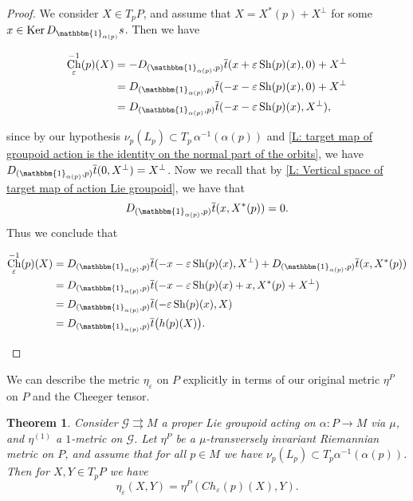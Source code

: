 \documentclass[12pt,a4paper,reqno]{amsart}
\DeclareMathOperator{\Ch}{Ch}
\DeclareMathOperator{\kernel}{Ker}
\DeclareMathOperator{\Sh}{Sh} %
\newcommand{\1}{\mathbbm{1}} %
\newcommand{\G}{\mathcal{G}} %
\newtheorem{thm}{Theorem}[section]
\theoremstyle{definition}
\theoremstyle{TheoremNum}
\begin{document}
\begin{proof}
We consider $X\in T_p P$, and assume that $X = X^\ast(p)+X^\perp$ for some $x\in \kernel D_{\1_{\alpha(p)}} s$. Then we have 
\begin{linenomath}
\begin{align*}
\Ch^{-1}_{\varepsilon}(p) (X) &= -D_{(\1_{\alpha(p)},p)} \overline{t}(x+\varepsilon \Sh(p)(x),0)+X^\perp\\
&=D_{(\1_{\alpha(p)},p)} \overline{t}(-x-\varepsilon \Sh(p)(x),0)+X^\perp\\
& = D_{(\1_{\alpha(p)},p)} \overline{t}(-x-\varepsilon \Sh(p)(x),X^\perp),
\end{align*}
\end{linenomath}
since by our hypothesis $\nu_p(L_p)\subset T_p\, \alpha^{-1}(\alpha(p))$ and \th\ref{L: target map of groupoid action is the identity on the normal part of the orbits}, we have \linebreak$D_{(\1_{\alpha(p)},p)}\overline{t}(0,X^\perp) = X^\perp$. Now we recall that by \th\ref{L: Vertical space of target map of action Lie groupoid}, we have that 
\[
D_{(\1_{\alpha(p)},p)} \overline{t}(x,X^\ast(p)) =0.
\]
Thus we conclude that 
\begin{linenomath}
\begin{align*}
\Ch^{-1}_{\varepsilon}(p) (X) &=D_{(\1_{\alpha(p)},p)} \overline{t}(-x-\varepsilon \Sh(p)(x),X^\perp) + D_{(\1_{\alpha(p)},p)} \overline{t}(x,X^\ast(p))\\
&= D_{(\1_{\alpha(p)},p)} \overline{t}(-x-\varepsilon \Sh(p)(x)+x,X^\ast(p)+X^\perp)\\
&= D_{(\1_{\alpha(p)},p)} \overline{t}(-\varepsilon\Sh(p)(x), X)\\
& =D_{(\1_{\alpha(p)},p)} \overline{t}\big( h(p)(X)\big).
\end{align*}
\end{linenomath}
\end{proof}

We can describe the metric $\eta_\varepsilon$ on $P$ explicitly in terms of our original metric $\eta^P$ on $P$ and the Cheeger tensor.


\begin{thm}\th\label{T: cheeger deformation controlled by cheeger tensor}
Consider $\G\rightrightarrows M$ a proper Lie groupoid acting on $\alpha\colon P\to M$  via $\mu$, and $\eta^{(1)}$  a $1$-metric on  $\G$. Let $\eta^P$ be a $\mu$-transversely invariant Riemannian metric on $P$, and assume that for all $p\in M$ we have $\nu_p (L_p)\subset T_p \alpha^{-1}(\alpha(p))$. Then for $X,Y\in T_pP$ we have
\[
\eta_\varepsilon(X,Y) = \eta^P(Ch_\varepsilon(p)(X),Y).
\]
\end{thm}
\end{document}
